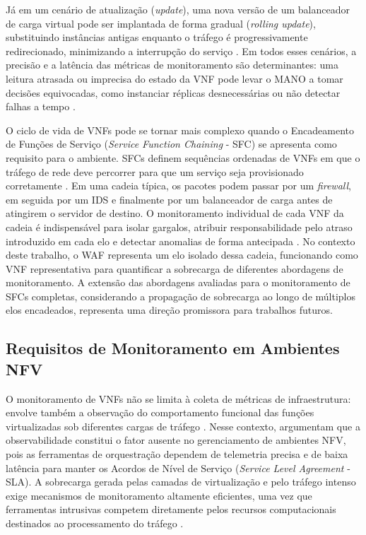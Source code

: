 Já em um cenário de atualização (\textit{update}), uma nova versão de um balanceador de carga virtual pode ser implantada de forma gradual (\textit{rolling update}), substituindo instâncias antigas enquanto o tráfego é progressivamente redirecionado, minimizando a interrupção do serviço \cite{repec:wly:intnem:v:31:y:2021:i:5:n:e2068}. Em todos esses cenários, a precisão e a latência das métricas de monitoramento são determinantes: uma leitura atrasada ou imprecisa do estado da VNF pode levar o MANO a tomar decisões equivocadas, como instanciar réplicas desnecessárias ou não detectar falhas a tempo \cite{10.1145/3397022, oliveira_observability_2026}.

O ciclo de vida de VNFs pode se tornar mais complexo quando o Encadeamento de Funções de Serviço (\textit{Service Function Chaining} - SFC) se apresenta como requisito para o ambiente. SFCs definem sequências ordenadas de VNFs em que o tráfego de rede deve percorrer para que um serviço seja provisionado corretamente \cite{rfc7665, 10.1145/3172866}. Em uma cadeia típica, os pacotes podem passar por um \textit{firewall}, em seguida por um IDS e finalmente por um balanceador de carga antes de atingirem o servidor de destino. O monitoramento individual de cada VNF da cadeia é indispensável para isolar gargalos, atribuir responsabilidade pelo atraso introduzido em cada elo e detectar anomalias de forma antecipada \cite{10.23919, oliveira_observability_2026}. No contexto deste trabalho, o WAF representa um elo isolado dessa cadeia, funcionando como VNF representativa para quantificar a sobrecarga de diferentes abordagens de monitoramento. A extensão das abordagens avaliadas para o monitoramento de SFCs completas, considerando a propagação de sobrecarga ao longo de múltiplos elos encadeados, representa uma direção promissora para trabalhos futuros.

\subsection{Requisitos de Monitoramento em Ambientes NFV}
\label{subsec:requisitos_monitoramento}

O monitoramento de VNFs não se limita à coleta de métricas de infraestrutura: envolve também a observação do comportamento funcional das funções virtualizadas sob diferentes cargas de tráfego \cite{10.23919}. Nesse contexto,  argumentam que a observabilidade constitui o fator ausente no gerenciamento de ambientes NFV, pois as ferramentas de orquestração dependem de telemetria precisa e de baixa latência para manter os Acordos de Nível de Serviço (\textit{Service Level Agreement} - SLA). A sobrecarga gerada pelas camadas de virtualização e pelo tráfego intenso exige mecanismos de monitoramento altamente eficientes, uma vez que ferramentas intrusivas competem diretamente pelos recursos computacionais destinados ao processamento do tráfego \cite{10.1145/3397022, 10.1109/NOMS47738.2020.9110434}.

